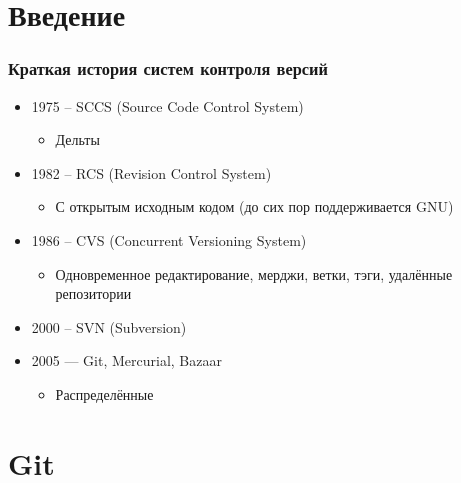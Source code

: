 \documentclass{../mcsslides}
\begin{document}
    \begin{frame}[plain]
        \titlepage
    \end{frame}

    \section{Введение}

    \begin{frame}
        \frametitle{Краткая история систем контроля версий}
        \begin{itemize}
            \item 1975 -- SCCS (Source Code Control System)
            \begin{itemize}
                \item Дельты
            \end{itemize}
            \item 1982 -- RCS (Revision Control System)
            \begin{itemize}
                \item С открытым исходным кодом (до сих пор поддерживается GNU)
            \end{itemize}
            \item 1986 -- CVS (Concurrent Versioning System)
            \begin{itemize}
                \item Одновременное редактирование, мерджи, ветки, тэги, удалённые репозитории
            \end{itemize}
            \item 2000 -- SVN (Subversion)
            \item 2005 --- Git, Mercurial, Bazaar
            \begin{itemize}
                \item Распределённые
            \end{itemize}
        \end{itemize}
    \end{frame}

    \section{Git}
\end{document}
